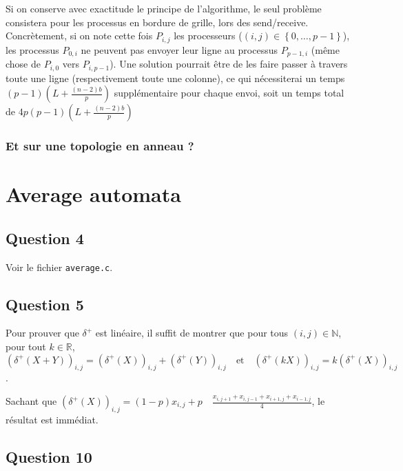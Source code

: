 \documentclass{article}
\begin{document}
Si on conserve avec exactitude le principe de l'algorithme, le seul problème consistera pour les processus en bordure de grille, lors des send/receive.
Concrètement, si on note cette fois $P_{i,j}$ les processeurs ($(i,j) \in \left\{ 0, \dots,p-1\right\}$), les processus $P_{0,i}$ ne peuvent pas envoyer leur ligne au processus $P_{p-1,i}$ (même chose de $P_{i,0}$ vers $P_{i,p-1}$).
Une solution pourrait être de les faire passer à travers toute une ligne (respectivement toute une colonne), ce qui nécessiterai un temps $(p-1)(L + \frac{(n-2)b}{p})$ supplémentaire pour chaque envoi, soit un temps total de $4p(p-1)(L + \frac{(n-2)b}{p})$

\subsubsection*{Et sur une topologie en anneau ?}

\section{Average automata}

\subsection*{Question 4} 

Voir le fichier \texttt{average.c}.

\subsection*{Question 5}

Pour prouver que $\delta^+$ est linéaire, il suffit de montrer que pour tous $(i,j) \in \mathbb{N}$, pour tout $k \in \mathbb{R}$, 
$$(\delta^+(X+Y))_{i,j} = (\delta^+(X))_{i,j} + (\delta^+(Y))_{i,j} \quad \text{et} \quad (\delta^+(kX))_{i,j} = k(\delta^+(X))_{i,j}$$.

Sachant que $(\delta^+(X))_{i,j} = (1-p)x_{i,j} + p \quad \frac{x_{i,j+1} + x_{i,j-1} + x_{i+1,j} + x_{i-1,j}}{4}$, le résultat est immédiat.

\subsection*{Question 10}
\end{document}
